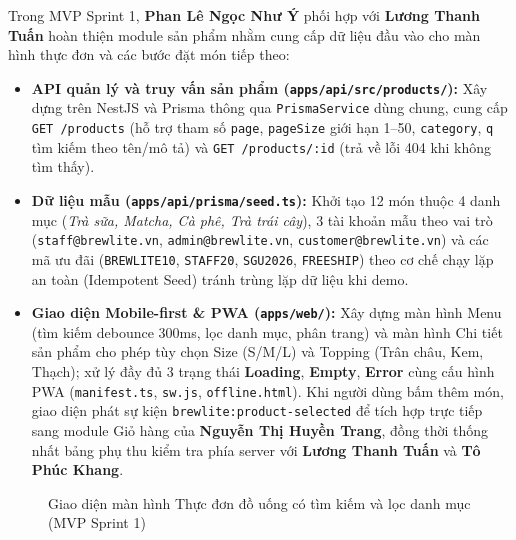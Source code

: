Trong MVP Sprint 1, \textbf{Phan Lê Ngọc Như Ý} phối hợp với \textbf{Lương Thanh Tuấn} hoàn thiện module sản phẩm nhằm cung cấp dữ liệu đầu vào cho màn hình thực đơn và các bước đặt món tiếp theo:
\begin{itemize}
    \item \textbf{API quản lý và truy vấn sản phẩm (\texttt{apps/api/src/products/}):} Xây dựng trên NestJS và Prisma thông qua \texttt{PrismaService} dùng chung, cung cấp \texttt{GET /products} (hỗ trợ tham số \texttt{page}, \texttt{pageSize} giới hạn 1--50, \texttt{category}, \texttt{q} tìm kiếm theo tên/mô tả) và \texttt{GET /products/:id} (trả về lỗi 404 khi không tìm thấy).
    \item \textbf{Dữ liệu mẫu (\texttt{apps/api/prisma/seed.ts}):} Khởi tạo 12 món thuộc 4 danh mục (\textit{Trà sữa, Matcha, Cà phê, Trà trái cây}), 3 tài khoản mẫu theo vai trò (\texttt{staff@brewlite.vn}, \texttt{admin@brewlite.vn}, \texttt{customer@brewlite.vn}) và các mã ưu đãi (\texttt{BREWLITE10}, \texttt{STAFF20}, \texttt{SGU2026}, \texttt{FREESHIP}) theo cơ chế chạy lặp an toàn (Idempotent Seed) tránh trùng lặp dữ liệu khi demo.
    \item \textbf{Giao diện Mobile-first \& PWA (\texttt{apps/web/}):} Xây dựng màn hình Menu (tìm kiếm debounce 300ms, lọc danh mục, phân trang) và màn hình Chi tiết sản phẩm cho phép tùy chọn Size (S/M/L) và Topping (Trân châu, Kem, Thạch); xử lý đầy đủ 3 trạng thái \textbf{Loading}, \textbf{Empty}, \textbf{Error} cùng cấu hình PWA (\texttt{manifest.ts}, \texttt{sw.js}, \texttt{offline.html}). Khi người dùng bấm thêm món, giao diện phát sự kiện \texttt{brewlite:product-selected} để tích hợp trực tiếp sang module Giỏ hàng của \textbf{Nguyễn Thị Huyền Trang}, đồng thời thống nhất bảng phụ thu kiểm tra phía server với \textbf{Lương Thanh Tuấn} và \textbf{Tô Phúc Khang}.
\end{itemize}

\begin{figure}[H]
\centering
{}
\caption{Giao diện màn hình Thực đơn đồ uống có tìm kiếm và lọc danh mục (MVP Sprint 1)}
\end{figure}

